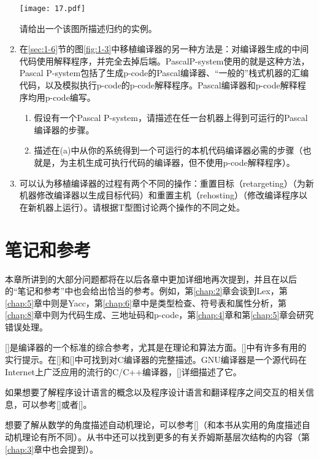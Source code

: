 \documentclass[lang=cn,10pt]{elegantbook}
\newcommand\citeauthoryear[1]{\citeauthor{#1}[\citeyear{#1}]}
\begin{document}
\begin{enumerate}
\begin{center}
  \texttt{[image: 17.pdf]}
\end{center}

  请给出一个该图所描述归约的实例。
  \item 在\ref{sec:1-6}节的图\ref{fig:1-3}中移植编译器的另一种方法是：对编译器生成的中间代码使用解释程序，并完全去掉后端。PascalP-system使用的就是这种方法，Pascal P-system包括了生成p-code的Pascal编译器、“一般的”栈式机器的汇编代码，以及模拟执行p-code的p-code解释程序。Pascal编译器和p-code解释程序均用p-code编写。
  \begin{enumerate}
    \item 假设有一个Pascal P-system，请描述在任一台机器上得到可运行的Pascal编译器的步骤。
    \item 描述在(a)中从你的系统得到一个可运行的本机代码编译器必需的步骤（也就是，为主机生成可执行代码的编译器，但不使用p-code解释程序）。
  \end{enumerate}
  \item 可以认为移植编译器的过程有两个不同的操作：重置目标（retargeting）（为新机器修改编译器以生成目标代码）和重置主机（rehosting）（修改编译程序以在新机器上运行）。请根据T型图讨论两个操作的不同之处。
\end{enumerate}

\section{笔记和参考}
\label{sec:1-10}

本章所讲到的大部分问题都将在以后各章中更加详细地再次提到，并且在以后的“笔记和参考”中也会给出恰当的参考。例如，第\ref{chap:2}章会谈到Lex，第\ref{chap:5}章中则是Yacc，第\ref{chap:6}章中是类型检查、符号表和属性分析，第\ref{chap:8}章中则为代码生成、三地址码和p-code，第\ref{chap:4}章和第\ref{chap:5}章会研究错误处理。

\citeauthoryear{aho2007compilers}是编译器的一个标准的综合参考，尤其是在理论和算法方面。\citeauthoryear{fischer1991crafting}中有许多有用的实行提示。在\citeauthoryear{fraser1995retargetable}和\citeauthoryear{holub1990compiler}中可找到对C编译器的完整描述。GNU编译器是一个源代码在Internet上广泛应用的流行的C/C++编译器，\citeauthoryear{stallman1994using}详细描述了它。

如果想要了解程序设计语言的概念以及程序设计语言和翻译程序之间交互的相关信息，可以参考\citeauthoryear{louden2011programming}或者\citeauthoryear{sethi1996programming}。

想要了解从数学的角度描述自动机理论，可以参考\citeauthoryear{hopcroft2001introduction}（和本书从实用的角度描述自动机理论有所不同）。从书中还可以找到更多的有关乔姆斯基层次结构的内容（第\ref{chap:3}章中也会提到）。
\end{document}
